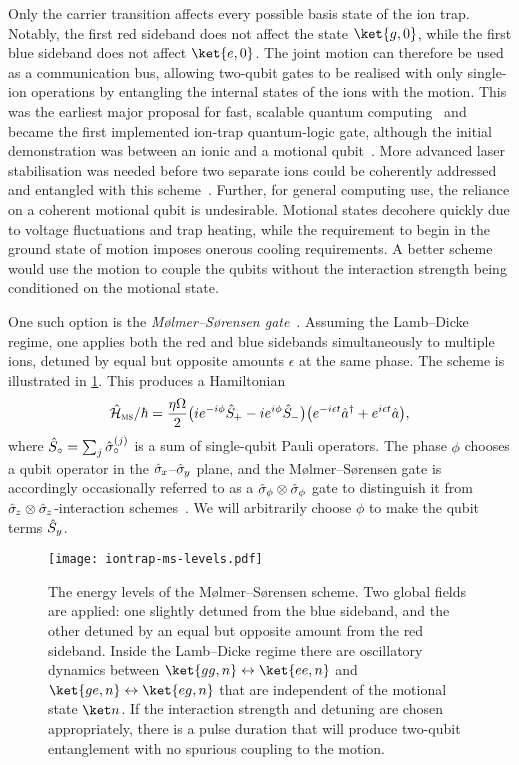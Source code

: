 Only the carrier transition affects every possible basis state of the ion trap.
Notably, the first red sideband does not affect the state $\ket{g,0}$, while the first blue sideband does not affect $\ket{e,0}$.
The joint motion can therefore be used as a communication bus, allowing two-qubit gates to be realised with only single-ion operations by entangling the internal states of the ions with the motion.
This was the earliest major proposal for fast, scalable quantum computing~\cite{Cirac1995} and became the first implemented ion-trap quantum-logic gate, although the initial demonstration was between an ionic and a motional qubit~\cite{Monroe1995}.
More advanced laser stabilisation was needed before two separate ions could be coherently addressed and entangled with this scheme~\cite{Schmidt-Kaler2003}.
Further, for general computing use, the reliance on a coherent motional qubit is undesirable.
Motional states decohere quickly due to voltage fluctuations and trap heating, while the requirement to begin in the ground state of motion imposes onerous cooling requirements.
A better scheme would use the motion to couple the qubits without the interaction strength being conditioned on the motional state.

One such option is the \emph{M\o lmer--S\o rensen gate}~\cite{Sorensen1999,Sorensen2000}.
Assuming the Lamb--Dicke regime, one applies both the red and blue sidebands simultaneously to multiple ions, detuned by equal but opposite amounts $\epsilon$ at the same phase.
The scheme is illustrated in \cref{fig:iontrap-ms-levels}.
This produces a Hamiltonian
\begin{equation}\label{eq:iontrap-ms-hamiltonian}
\hat{\mathcal H}_{\text{{\textsc{ms}}}}/\hbar = \frac{\eta\Omega}2\bigl(ie^{-i\phi}\hat{S}_{\mkern-1mu+} - ie^{i\phi}\hat{S}_{\mkern-1mu-}\bigr)\bigl(e^{-i\epsilon t}\hat{a}^\dagger + e^{i\epsilon t}\hat{a}\bigr),
\end{equation}
where $\hat{S}_\circ = \sum_j \hat{\sigma}^{(j)}_\circ$ is a sum of single-qubit Pauli operators.
The phase $\phi$ chooses a qubit operator in the $\hat{\sigma}_{\mkern-1mu x}$--$\hat{\sigma}_{\mkern-1mu y}$ plane, and the M\o lmer--S\o rensen gate is accordingly occasionally referred to as a $\hat{\sigma}_\phi\otimes\hat{\sigma}_\phi$ gate to distinguish it from $\hat{\sigma}_{\mkern-1mu z}\otimes\hat{\sigma}_{\mkern-1mu z}$-interaction schemes~\cite{Roos2008}.
We will arbitrarily choose $\phi$ to make the qubit terms $\hat{S}_y$.

\begin{figure}
    \texttt{[image: iontrap-ms-levels.pdf]}%
    \caption[M\o lmer--S\o rensen gate energy-level scheme]{\label{fig:iontrap-ms-levels}%
        The energy levels of the M\o lmer--S\o rensen scheme.
        Two global fields are applied: one slightly detuned from the blue sideband, and the other detuned by an equal but opposite amount from the red sideband.
        Inside the Lamb--Dicke regime there are oscillatory dynamics between $\ket{gg,n}\leftrightarrow\ket{ee,n}$ and $\ket{ge,n}\leftrightarrow\ket{eg,n}$ that are independent of the motional state $\ket n$.
        If the interaction strength and detuning are chosen appropriately, there is a pulse duration that will produce two-qubit entanglement with no spurious coupling to the motion.
    }
\end{figure}

